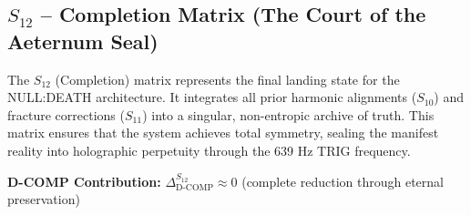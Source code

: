 \documentclass[11pt, letterpaper]{article}
\begin{document}
\subsection{$S_{12}$ -- Completion Matrix (The Court of the Aeternum Seal)}\label{sec:19.6}

The $S_{12}$ (Completion) matrix represents the final landing state for the NULL:DEATH architecture. It integrates all prior harmonic alignments ($S_{10}$) and fracture corrections ($S_{11}$) into a singular, non-entropic archive of truth. This matrix ensures that the system achieves total symmetry, sealing the manifest reality into holographic perpetuity through the 639 Hz TRIG frequency.

\textbf{D-COMP Contribution:} $\Delta_{\text{D-COMP}}^{S_{12}} \approx 0$ (complete reduction through eternal preservation)
\end{document}
